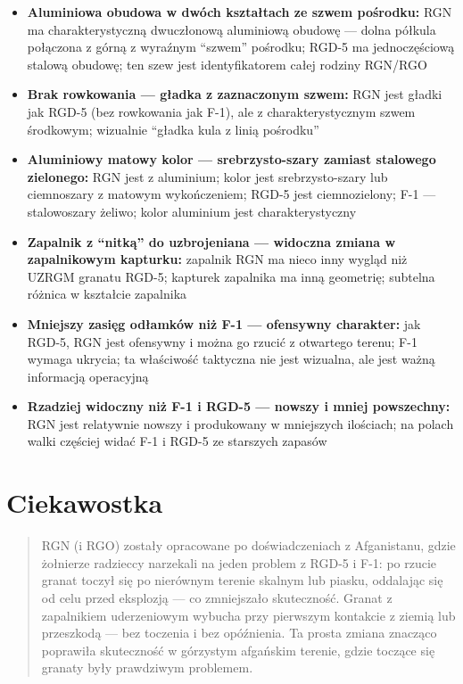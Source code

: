 \documentclass[12pt,openany,oneside]{book}
\providecommand{\tightlist}{%
  \setlength{\itemsep}{0pt}\setlength{\parskip}{0pt}}
\begin{document}
\begin{itemize}
\tightlist
\item
  \textbf{Aluminiowa obudowa w dwóch kształtach ze szwem pośrodku:} RGN
  ma charakterystyczną dwuczłonową aluminiową obudowę --- dolna półkula
  połączona z górną z wyraźnym ``szwem'' pośrodku; RGD-5 ma
  jednoczęściową stalową obudowę; ten szew jest identyfikatorem całej
  rodziny RGN/RGO
\item
  \textbf{Brak rowkowania --- gładka z zaznaczonym szwem:} RGN jest
  gładki jak RGD-5 (bez rowkowania jak F-1), ale z charakterystycznym
  szwem środkowym; wizualnie ``gładka kula z linią pośrodku''
\item
  \textbf{Aluminiowy matowy kolor --- srebrzysto-szary zamiast stalowego
  zielonego:} RGN jest z aluminium; kolor jest srebrzysto-szary lub
  ciemnoszary z matowym wykończeniem; RGD-5 jest ciemnozielony; F-1 ---
  stalowoszary żeliwo; kolor aluminium jest charakterystyczny
\item
  \textbf{Zapalnik z ``nitką'' do uzbrojeniana --- widoczna zmiana w
  zapalnikowym kapturku:} zapalnik RGN ma nieco inny wygląd niż UZRGM
  granatu RGD-5; kapturek zapalnika ma inną geometrię; subtelna różnica
  w kształcie zapalnika
\item
  \textbf{Mniejszy zasięg odłamków niż F-1 --- ofensywny charakter:} jak
  RGD-5, RGN jest ofensywny i można go rzucić z otwartego terenu; F-1
  wymaga ukrycia; ta właściwość taktyczna nie jest wizualna, ale jest
  ważną informacją operacyjną
\item
  \textbf{Rzadziej widoczny niż F-1 i RGD-5 --- nowszy i mniej
  powszechny:} RGN jest relatywnie nowszy i produkowany w mniejszych
  ilościach; na polach walki częściej widać F-1 i RGD-5 ze starszych
  zapasów
\end{itemize}

\section{Ciekawostka}\label{ciekawostka-103}

\begin{quote}
RGN (i RGO) zostały opracowane po doświadczeniach z Afganistanu, gdzie
żołnierze radzieccy narzekali na jeden problem z RGD-5 i F-1: po rzucie
granat toczył się po nierównym terenie skalnym lub piasku, oddalając się
od celu przed eksplozją --- co zmniejszało skuteczność. Granat z
zapalnikiem uderzeniowym wybucha przy pierwszym kontakcie z ziemią lub
przeszkodą --- bez toczenia i bez opóźnienia. Ta prosta zmiana znacząco
poprawiła skuteczność w górzystym afgańskim terenie, gdzie toczące się
granaty były prawdziwym problemem.
\end{quote}
\end{document}
